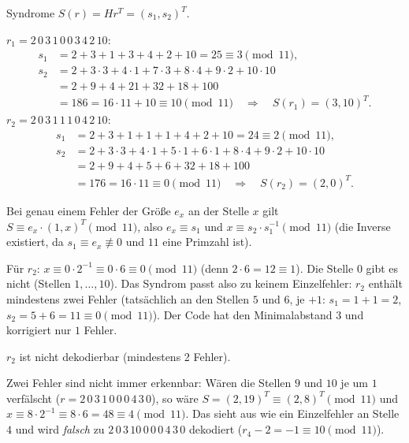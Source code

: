  Syndrome $S(r) = H r^T = (s_1, s_2)^T$.

$r_1 = 2\,0\,3\,1\,0\,0\,3\,4\,2\,10$:
\begin{align*}
s_1 &= 2 + 3 + 1 + 3 + 4 + 2 + 10 = 25 \equiv 3 \pmod{11},\\
s_2 &= 2 + 3 \cdot 3 + 4 \cdot 1 + 7 \cdot 3 + 8 \cdot 4 + 9 \cdot 2 + 10 \cdot 10\\
    &= 2 + 9 + 4 + 21 + 32 + 18 + 100\\
    &= 186 = 16 \cdot 11 + 10 \equiv 10 \pmod{11}
\quad\Rightarrow\quad S(r_1) = (3, 10)^T .
\end{align*}
$r_2 = 2\,0\,3\,1\,1\,1\,0\,4\,2\,10$:
\begin{align*}
s_1 &= 2 + 3 + 1 + 1 + 1 + 4 + 2 + 10 = 24 \equiv 2 \pmod{11},\\
s_2 &= 2 + 3 \cdot 3 + 4 \cdot 1 + 5 \cdot 1 + 6 \cdot 1 + 8 \cdot 4 + 9 \cdot 2 + 10 \cdot 10\\
    &= 2 + 9 + 4 + 5 + 6 + 32 + 18 + 100\\
    &= 176 = 16 \cdot 11 \equiv 0 \pmod{11}
\quad\Rightarrow\quad S(r_2) = (2, 0)^T .
\end{align*}

 Bei genau einem Fehler der Größe $e_x$ an der Stelle $x$ gilt $S \equiv e_x \cdot (1, x)^T \pmod{11}$,
also $e_x \equiv s_1$ und $x \equiv s_2 \cdot s_1^{-1} \pmod{11}$
(die Inverse existiert, da $s_1 \equiv e_x \not\equiv 0$ und $11$ eine Primzahl ist).

Für $r_2$: $x \equiv 0 \cdot 2^{-1} \equiv 0 \cdot 6 \equiv 0 \pmod{11}$ (denn $2 \cdot 6 = 12 \equiv 1$). Die Stelle $0$ gibt es nicht (Stellen $1, \dots, 10$).
Das Syndrom passt also zu keinem Einzelfehler: $r_2$ enthält mindestens zwei Fehler
(tatsächlich an den Stellen $5$ und $6$, je $+1$: $s_1 = 1 + 1 = 2$, $s_2 = 5 + 6 = 11 \equiv 0 \pmod{11}$).
Der Code hat den Minimalabstand $3$ und korrigiert nur $1$ Fehler.
\begin{ergebnis} $r_2$ ist nicht dekodierbar (mindestens 2 Fehler). \end{ergebnis}
\begin{achtung}
Zwei Fehler sind nicht immer erkennbar: Wären die Stellen $9$ und $10$ je um $1$ verfälscht
($r = 2\,0\,3\,1\,0\,0\,0\,4\,3\,0$), so wäre $S = (2, 19)^T \equiv (2, 8)^T \pmod{11}$ und $x \equiv 8 \cdot 2^{-1} \equiv 8 \cdot 6 = 48 \equiv 4 \pmod{11}$.
Das sieht aus wie ein Einzelfehler an Stelle $4$ und wird \emph{falsch} zu $2\,0\,3\,10\,0\,0\,0\,4\,3\,0$ dekodiert ($r_4 - 2 = -1 \equiv 10 \pmod{11}$).
\end{achtung}

